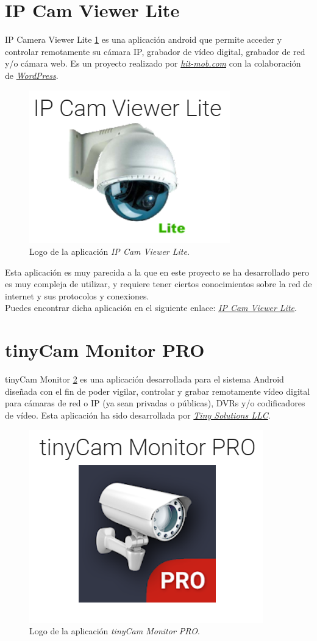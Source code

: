 
\section{IP Cam Viewer Lite}

IP Camera Viewer Lite \ref{fig:hitmob} es una aplicación android que permite acceder y controlar remotamente su cámara IP, grabador de vídeo digital, grabador de red y/o cámara web. Es un proyecto realizado por \href{https://hit-mob.com}{\textit{hit-mob.com}} con la colaboración de \href{https://wordpress.com}{\textit{WordPress}}.

\begin{figure}[h!]
	\centering
	\includegraphics[width=0.35\linewidth]{img/ipCamViewerLite}
	\caption{Logo de la aplicación \textit{IP Cam Viewer Lite}.}
	\label{fig:hitmob}
\end{figure}

Esta aplicación es muy parecida a la que en este proyecto se ha desarrollado pero es muy compleja de utilizar, y requiere tener ciertos conocimientos sobre la red de internet y sus protocolos y conexiones.\\

Puedes encontrar dicha aplicación en el siguiente enlace: \href{https://play.google.com/store/apps/details?id=com.rcreations.ipcamviewer}{\textit{IP Cam Viewer Lite}}.



\section{tinyCam Monitor PRO}

tinyCam Monitor \ref{fig:tinyCam} es una aplicación desarrollada para el sistema Android diseñada con el fin de poder vigilar, controlar y grabar remotamente vídeo digital para cámaras de red o IP (ya sean privadas o públicas), DVRs y/o codificadores de vídeo.
Esta aplicación ha sido desarrollada por \href{https://tinysolutionsllc.com}{\textit{Tiny Solutions LLC}}.

\begin{figure}[h!]
	\centering
	\includegraphics[width=0.35\linewidth]{img/tinyCam-Monitor-PRO}
	\caption{Logo de la aplicación \textit{tinyCam Monitor PRO}.}
	\label{fig:tinyCam}
\end{figure} 

